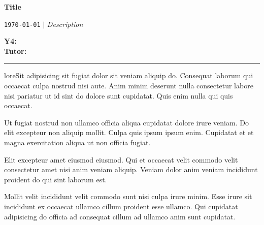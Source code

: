 \documentclass[a4paper]{article}
\begin{document}
\begin{Large}
    \textbf{Title} \\
\end{Large}

\begin{large}
    \texttt{\today} $\vert$ \textit{Description} \\
\end{large}



\textsf{\textbf{Y4:}} \\
\textsf{\textbf{Tutor:}} 


\vspace{1em}
\hrule
\vspace{1.5em}

loreSit adipisicing sit fugiat dolor sit veniam aliquip do. Consequat laborum qui occaecat culpa nostrud nisi aute. Anim minim deserunt nulla consectetur labore nisi pariatur ut id sint do dolore sunt cupidatat. Quis enim nulla qui quis occaecat.

Ut fugiat nostrud non ullamco officia aliqua cupidatat dolore irure veniam. Do elit excepteur non aliquip mollit. Culpa quis ipsum ipsum enim. Cupidatat et et magna exercitation aliqua ut non officia fugiat.

Elit excepteur amet eiusmod eiusmod. Qui et occaecat velit commodo velit consectetur amet nisi anim veniam aliquip. Veniam dolor anim veniam incididunt proident do qui sint laborum est.

Mollit velit incididunt velit commodo sunt nisi culpa irure minim. Esse irure sit incididunt ex occaecat ullamco cillum proident esse ullamco. Qui cupidatat adipisicing do officia ad consequat cillum ad ullamco anim sunt cupidatat.
\end{document}
